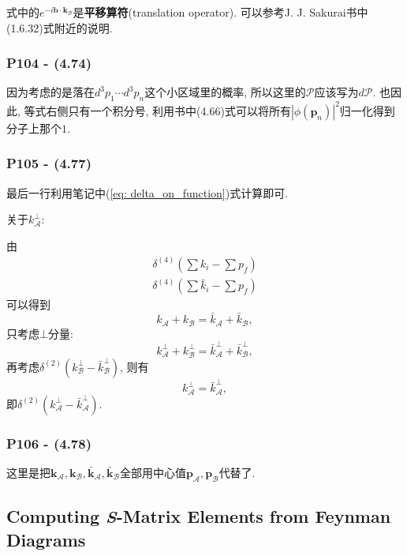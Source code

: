 \documentclass[cn,hazy,green,11pt,device=normal,chinesefont=founder]{elegantnote}
\begin{document}
式中的$e^{-i\mathbf{b}\cdot\mathbf{k_{\mathcal{B}}}}$是\textbf{平移算符}(translation operator). 可以参考J. J. Sakurai书中(1.6.32)式附近的说明. 

\subsubsection{P104 - (4.74)}

因为考虑的是落在$d^3p_1\cdots d^3p_n$这个小区域里的概率, 所以这里的$\mathcal{P}$应该写为$d\mathcal{P}$. 也因此, 等式右侧只有一个积分号, 利用书中(4.66)式可以将所有$|\phi(\mathbf{p}_n)|^2$归一化得到分子上那个$1$. 

\subsubsection{P105 - (4.77)}

最后一行利用笔记中(\ref{eq: delta_on_function})式计算即可. 

关于$k_{\mathcal{A}}^{\bot}$: 

由
\begin{gather}
  \delta^{(4)}(\sum k_i - \sum p_f) \\
  \delta^{(4)}(\sum \bar{k}_i - \sum p_f)
\end{gather}
可以得到
\begin{equation}
  k_\mathcal{A} + k_\mathcal{B} = \bar{k}_\mathcal{A} + \bar{k}_\mathcal{B}, 
\end{equation}
只考虑$\bot$分量: 
\begin{equation}
  k_{\mathcal{A}}^{\bot} + k_{\mathcal{B}}^{\bot} = \bar{k}_{\mathcal{A}}^{\bot} + \bar{k}_{\mathcal{B}}^{\bot}, 
\end{equation}
再考虑$\delta^{(2)}(k_{\mathcal{B}}^{\bot} - \bar{k}_{\mathcal{B}}^{\bot})$, 则有
\begin{equation}
  k_{\mathcal{A}}^{\bot} = \bar{k}_{\mathcal{A}}^{\bot}, 
\end{equation}
即$\delta^{(2)}(k_{\mathcal{A}}^{\bot} - \bar{k}_{\mathcal{A}}^{\bot})$.

\subsubsection{P106 - (4.78)}

这里是把$\mathbf{k}_{\mathcal{A}}, \mathbf{k}_{\mathcal{B}}, \bar{\mathbf{k}}_{\mathcal{A}}, \bar{\mathbf{k}}_{\mathcal{B}}$全部用中心值$\mathbf{p}_{\mathcal{A}}, \mathbf{p}_{\mathcal{B}}$代替了. 

\subsection{Computing \textit{S}-Matrix Elements from Feynman Diagrams}
\end{document}
